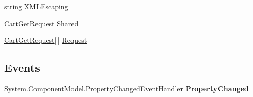 \begin{DoxyCompactItemize}
\begin{DoxyCompactList}\small\item\em \end{DoxyCompactList}\item 
\hypertarget{class_price___comparison_1_1amazon_1_1ecs_1_1_cart_get_ad71f26c1f0cd1400e0311a80fe728b27}{string \hyperlink{class_price___comparison_1_1amazon_1_1ecs_1_1_cart_get_ad71f26c1f0cd1400e0311a80fe728b27}{X\-M\-L\-Escaping}}\label{class_price___comparison_1_1amazon_1_1ecs_1_1_cart_get_ad71f26c1f0cd1400e0311a80fe728b27}

\begin{DoxyCompactList}\small\item\em \end{DoxyCompactList}\item 
\hypertarget{class_price___comparison_1_1amazon_1_1ecs_1_1_cart_get_af47dd01d54eb11886d3c3414ad2ab21a}{\hyperlink{class_price___comparison_1_1amazon_1_1ecs_1_1_cart_get_request}{Cart\-Get\-Request} \hyperlink{class_price___comparison_1_1amazon_1_1ecs_1_1_cart_get_af47dd01d54eb11886d3c3414ad2ab21a}{Shared}}\label{class_price___comparison_1_1amazon_1_1ecs_1_1_cart_get_af47dd01d54eb11886d3c3414ad2ab21a}

\begin{DoxyCompactList}\small\item\em \end{DoxyCompactList}\item 
\hypertarget{class_price___comparison_1_1amazon_1_1ecs_1_1_cart_get_ae674ef773694f320d5621655241957c4}{\hyperlink{class_price___comparison_1_1amazon_1_1ecs_1_1_cart_get_request}{Cart\-Get\-Request}\mbox{[}$\,$\mbox{]} \hyperlink{class_price___comparison_1_1amazon_1_1ecs_1_1_cart_get_ae674ef773694f320d5621655241957c4}{Request}}\label{class_price___comparison_1_1amazon_1_1ecs_1_1_cart_get_ae674ef773694f320d5621655241957c4}

\begin{DoxyCompactList}\small\item\em \end{DoxyCompactList}\end{DoxyCompactItemize}
\subsection*{Events}
\begin{DoxyCompactItemize}
\item 
\hypertarget{class_price___comparison_1_1amazon_1_1ecs_1_1_cart_get_a0a86f4040e6356d42bdbb81e6d00e96c}{System.\-Component\-Model.\-Property\-Changed\-Event\-Handler {\bfseries Property\-Changed}}\label{class_price___comparison_1_1amazon_1_1ecs_1_1_cart_get_a0a86f4040e6356d42bdbb81e6d00e96c}

\end{DoxyCompactItemize}
